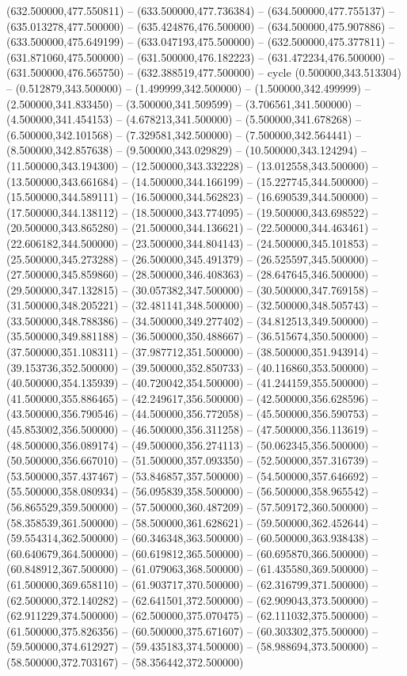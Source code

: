    (632.500000,477.550811) -- (633.500000,477.736384) -- (634.500000,477.755137) -- (635.013278,477.500000) -- (635.424876,476.500000) -- (634.500000,475.907886) -- (633.500000,475.649199) -- (633.047193,475.500000) -- (632.500000,475.377811) -- (631.871060,475.500000) -- (631.500000,476.182223) -- (631.472234,476.500000) -- (631.500000,476.565750) -- (632.388519,477.500000) -- cycle
   (0.500000,343.513304) -- (0.512879,343.500000) -- (1.499999,342.500000) -- (1.500000,342.499999) -- (2.500000,341.833450) -- (3.500000,341.509599) -- (3.706561,341.500000) -- (4.500000,341.454153) -- (4.678213,341.500000) -- (5.500000,341.678268) -- (6.500000,342.101568) -- (7.329581,342.500000) -- (7.500000,342.564441) -- (8.500000,342.857638) -- (9.500000,343.029829) -- (10.500000,343.124294) -- (11.500000,343.194300) -- (12.500000,343.332228) -- (13.012558,343.500000) -- (13.500000,343.661684) -- (14.500000,344.166199) -- (15.227745,344.500000) -- (15.500000,344.589111) -- (16.500000,344.562823) -- (16.690539,344.500000) -- (17.500000,344.138112) -- (18.500000,343.774095) -- (19.500000,343.698522) -- (20.500000,343.865280) -- (21.500000,344.136621) -- (22.500000,344.463461) -- (22.606182,344.500000) -- (23.500000,344.804143) -- (24.500000,345.101853) -- (25.500000,345.273288) -- (26.500000,345.491379) -- (26.525597,345.500000) -- (27.500000,345.859860) -- (28.500000,346.408363) -- (28.647645,346.500000) -- (29.500000,347.132815) -- (30.057382,347.500000) -- (30.500000,347.769158) -- (31.500000,348.205221) -- (32.481141,348.500000) -- (32.500000,348.505743) -- (33.500000,348.788386) -- (34.500000,349.277402) -- (34.812513,349.500000) -- (35.500000,349.881188) -- (36.500000,350.488667) -- (36.515674,350.500000) -- (37.500000,351.108311) -- (37.987712,351.500000) -- (38.500000,351.943914) -- (39.153736,352.500000) -- (39.500000,352.850733) -- (40.116860,353.500000) -- (40.500000,354.135939) -- (40.720042,354.500000) -- (41.244159,355.500000) -- (41.500000,355.886465) -- (42.249617,356.500000) -- (42.500000,356.628596) -- (43.500000,356.790546) -- (44.500000,356.772058) -- (45.500000,356.590753) -- (45.853002,356.500000) -- (46.500000,356.311258) -- (47.500000,356.113619) -- (48.500000,356.089174) -- (49.500000,356.274113) -- (50.062345,356.500000) -- (50.500000,356.667010) -- (51.500000,357.093350) -- (52.500000,357.316739) -- (53.500000,357.437467) -- (53.846857,357.500000) -- (54.500000,357.646692) -- (55.500000,358.080934) -- (56.095839,358.500000) -- (56.500000,358.965542) -- (56.865529,359.500000) -- (57.500000,360.487209) -- (57.509172,360.500000) -- (58.358539,361.500000) -- (58.500000,361.628621) -- (59.500000,362.452644) -- (59.554314,362.500000) -- (60.346348,363.500000) -- (60.500000,363.938438) -- (60.640679,364.500000) -- (60.619812,365.500000) -- (60.695870,366.500000) -- (60.848912,367.500000) -- (61.079063,368.500000) -- (61.435580,369.500000) -- (61.500000,369.658110) -- (61.903717,370.500000) -- (62.316799,371.500000) -- (62.500000,372.140282) -- (62.641501,372.500000) -- (62.909043,373.500000) -- (62.911229,374.500000) -- (62.500000,375.070475) -- (62.111032,375.500000) -- (61.500000,375.826356) -- (60.500000,375.671607) -- (60.303302,375.500000) -- (59.500000,374.612927) -- (59.435183,374.500000) -- (58.988694,373.500000) -- (58.500000,372.703167) -- (58.356442,372.500000) 
